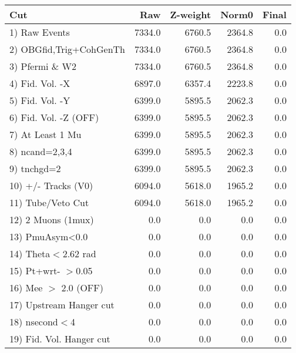  \begin{table}[h!]\centering
 \begin{tabular}{||l||r|r|r|r||}
 \hline
 \hline
 Cut & Raw & Z-weight & Norm0 & Final \\
 \hline
  1) Raw Events           &      7334.0 &      6760.5 &      2364.8 &         0.0 \\
  2) OBGfid,Trig+CohGenTh &      7334.0 &      6760.5 &      2364.8 &         0.0 \\
  3) Pfermi \& W2         &      7334.0 &      6760.5 &      2364.8 &         0.0 \\
  4) Fid. Vol. -X         &      6897.0 &      6357.4 &      2223.8 &         0.0 \\
  5) Fid. Vol. -Y         &      6399.0 &      5895.5 &      2062.3 &         0.0 \\
  6) Fid. Vol. -Z (OFF)   &      6399.0 &      5895.5 &      2062.3 &         0.0 \\
  7) At Least 1 Mu        &      6399.0 &      5895.5 &      2062.3 &         0.0 \\
  8) ncand=2,3,4          &      6399.0 &      5895.5 &      2062.3 &         0.0 \\
  9) tnchgd=2             &      6399.0 &      5895.5 &      2062.3 &         0.0 \\
 10) +/- Tracks (V0)      &      6094.0 &      5618.0 &      1965.2 &         0.0 \\
 11) Tube/Veto Cut        &      6094.0 &      5618.0 &      1965.2 &         0.0 \\
 12) 2 Muons (1mux)       &         0.0 &         0.0 &         0.0 &         0.0 \\
 13) PmuAsym<0.0          &         0.0 &         0.0 &         0.0 &         0.0 \\
 14) Theta$<$2.62 rad     &         0.0 &         0.0 &         0.0 &         0.0 \\
 15) Pt+wrt- $>$0.05      &         0.0 &         0.0 &         0.0 &         0.0 \\
 16) Mee $>$ 2.0  (OFF)   &         0.0 &         0.0 &         0.0 &         0.0 \\
 17) Upstream Hanger cut  &         0.0 &         0.0 &         0.0 &         0.0 \\
 18) nsecond$<$4          &         0.0 &         0.0 &         0.0 &         0.0 \\
 19) Fid. Vol. Hanger cut &         0.0 &         0.0 &         0.0 &         0.0 \\

\end{tabular}
\end{table}
